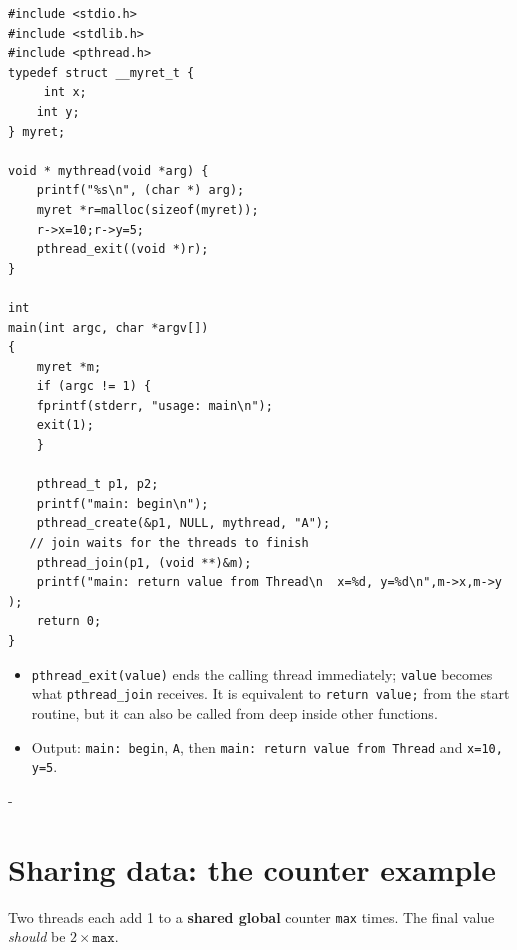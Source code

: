 \documentclass[11pt,a4paper]{article}
\makeatletter
\newcommand{\keepspace}[1]{\par\penalty-100\begingroup
  \setlength{\dimen@}{#1}\dimen@ii\pagegoal\advance\dimen@ii-\pagetotal
  \ifdim\dimen@>\dimen@ii\ifdim\dimen@ii>\z@\vfil\fi\break\fi\endgroup}
\makeatother
\begin{document}
\begin{lstlisting}
#include <stdio.h>
#include <stdlib.h>
#include <pthread.h>
typedef struct __myret_t {
     int x;
    int y;
} myret;

void * mythread(void *arg) {
    printf("%s\n", (char *) arg);
    myret *r=malloc(sizeof(myret));
    r->x=10;r->y=5;
    pthread_exit((void *)r);
}

int
main(int argc, char *argv[])
{
    myret *m;
    if (argc != 1) {
    fprintf(stderr, "usage: main\n");
    exit(1);
    }

    pthread_t p1, p2;
    printf("main: begin\n");
    pthread_create(&p1, NULL, mythread, "A");
   // join waits for the threads to finish
    pthread_join(p1, (void **)&m);
    printf("main: return value from Thread\n  x=%d, y=%d\n",m->x,m->y );
    return 0;
}
\end{lstlisting}

\begin{itemize}
  \item \texttt{pthread\_exit(value)} ends the calling thread immediately;
        \texttt{value} becomes what \texttt{pthread\_join} receives. It is
        equivalent to \texttt{return value;} from the start routine, but it
        can also be called from deep inside other functions.
  \item Output: \texttt{main: begin}, \texttt{A}, then
        \texttt{main: return value from Thread} and \texttt{x=10, y=5}.
\end{itemize}

\keepspace{30\baselineskip}
\section{Sharing data: the counter example}

Two threads each add 1 to a \textbf{shared global} counter \texttt{max}
times. The final value \emph{should} be \(2 \times \texttt{max}\).
\end{document}

